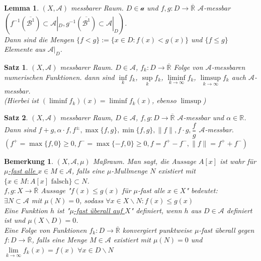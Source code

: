 \documentclass[11pt]{memoir}
\theoremstyle{break}
\newtheorem{Bemerkung}{Bemerkung}[chapter]
\newtheorem{Lemma}{Lemma}[chapter]
\newtheorem{Satz}{Satz}[chapter]
\begin{document}
\begin{Lemma}
$(X, \mathscr A)$ messbarer Raum. $D \in \mathscr a$ und $f, g: D \rightarrow \overline{\mathbb R }$ $\mathscr A$-messbar \\
$ \left( f^{-1}(\overline{\mathscr{B}^1}) \subset \mathscr A |_D, g^{-1}(\overline{\mathscr{B}^1}) \subset \mathscr A |_D\right)$. \\ Dann sind die Mengen $\{f < g\}:= \{x \in D: f(x) < g(x)\}$ und $\{f \leq g\}$ Elemente aus $\mathscr A |_D$.
\end{Lemma}

\begin{Satz}
$(X, \mathscr A)$ messbarer Raum. $D \in \mathscr A$, $f_k: D \rightarrow \overline{\mathbb R}$ Folge von $\mathscr A$-messbaren numerischen Funktionen. dann sind $\inf\limits_k f_k$, $\sup\limits_k f_k$, $\liminf\limits_{k\rightarrow \infty} f_k$, $\limsup\limits_{k \rightarrow \infty} f_k$ auch $\mathscr A$-messbar. \\
(Hierbei ist $(\liminf f_k)(x) = \liminf f_k(x)$, ebenso $\limsup$)
\end{Satz}

\begin{Satz}
$(X, \mathscr A)$ messbarer Raum, $D \in \mathscr A$, $f, g: D \rightarrow \overline{\mathbb R }$ $\mathscr A$-messbar und $\alpha \in \mathbb R$. Dann sind $f+g, \alpha \cdotp f, f^\pm, \max{\{f, g\}}, \min{\{f, g\}}, \|f\|, f \cdotp g, \dfrac{f}{g}$ $\mathscr A$-messbar. \\
$\left( f^+ = \max{\{f, 0\}} \geq 0, f^- = \max{\{-f, 0\}} \geq 0, f = f^+ - f^-, \|f\| = f^+ + f^- \right)$
\end{Satz}

\begin{Bemerkung}
$(X, \mathscr A, \mu)$ Maßraum. Man sagt, die Aussage $A[x]$ ist wahr für \underline{$\mu$-fast alle $x \in M \in \mathscr A$}, falls eine $\mu$-Mullmenge $N$ existiert mit $\{x \in M: A[x]  \text{ falsch}\} \subset N$.\\
$f, g: X \rightarrow \overline{\mathbb R}$ Aussage  "$f(x) \leq g(x)$ für $\mu$-fast alle $x \in X$"  bedeutet: \\
$\exists N \subset \mathscr A$ mit $\mu(N) = 0$, sodass $\forall x \in X\backslash N: f(x) \leq g(x)$ \\
Eine Funktion $h$ ist "\underline{$\mu$-fast überall auf $X$}" definiert, wenn $h$ aus $D \in \mathscr A$ definiert ist und $\mu(X \backslash D) = 0$. \\
Eine Folge von Funktionen $f_k: D \rightarrow \overline{\mathbb R}$ konvergiert punktweise $\mu$-fast überall gegen $f: D \rightarrow \overline{\mathbb R}$, falls eine Menge $M \in \mathscr A$ existiert mit $\mu(N) = 0$ und $\lim\limits_ {k \rightarrow \infty} f_k(x) = f(x)$ $\forall x \in D \backslash N$
\end{Bemerkung}
\end{document}
